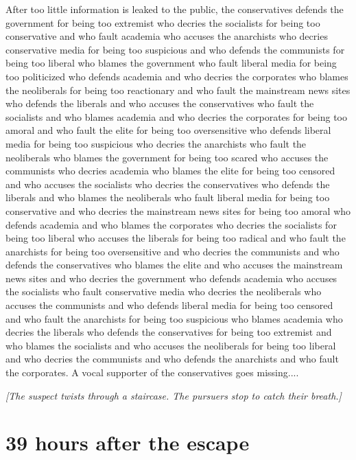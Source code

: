 \documentclass{report}
\begin{document}
After too little information is leaked to the public, the conservatives defends the government for being too extremist who decries the socialists for being too conservative and who fault academia who accuses the anarchists who decries conservative media for being too suspicious and who defends the communists for being too liberal who blames the government who fault liberal media for being too politicized who defends academia and who decries the corporates who blames the neoliberals for being too reactionary and who fault the mainstream news sites who defends the liberals and who accuses the conservatives who fault the socialists and who blames academia and who decries the corporates for being too amoral and who fault the elite for being too oversensitive who defends liberal media for being too suspicious who decries the anarchists who fault the neoliberals who blames the government for being too scared who accuses the communists who decries academia who blames the elite for being too censored and who accuses the socialists who decries the conservatives who defends the liberals and who blames the neoliberals who fault liberal media for being too conservative and who decries the mainstream news sites for being too amoral who defends academia and who blames the corporates who decries the socialists for being too liberal who accuses the liberals for being too radical and who fault the anarchists for being too oversensitive and who decries the communists and who defends the conservatives who blames the elite and who accuses the mainstream news sites and who decries the government who defends academia who accuses the socialists who fault conservative media who decries the neoliberals who accuses the communists and who defends liberal media for being too censored and who fault the anarchists for being too suspicious who blames academia who decries the liberals who defends the conservatives for being too extremist and who blames the socialists and who accuses the neoliberals for being too liberal and who decries the communists and who defends the anarchists and who fault the corporates. A vocal supporter of the conservatives goes missing....

\textit{[The suspect twists through a staircase. The pursuers stop to catch their breath.]}


\section*{39 \small{hours after the escape}}
\end{document}
